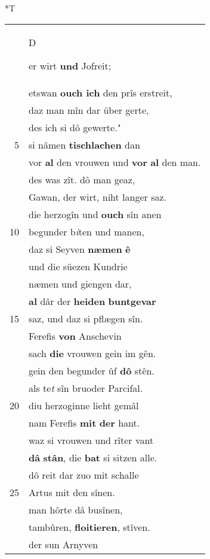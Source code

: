 \documentclass[8pt,a4paper,notitlepage]{article}
\begin{document}
\begin{table}[ht]
\begin{minipage}[t]{0.5\linewidth}
\small
\begin{center}*T
\end{center}
\begin{tabular}{rl}
 & \begin{large}D\end{large}er wirt \textbf{und} Jofreit;\\ 
 & etswan \textbf{ouch ich} den prîs erstreit,\\ 
 & daz man mîn dar über gerte,\\ 
 & des ich si dô gewerte."\\ 
5 & si nâmen \textbf{tischlachen} dan\\ 
 & vor \textbf{al} den vrouwen und \textbf{vor} \textbf{al} den man.\\ 
 & des was zît. dô man geaz,\\ 
 & Gawan, der wirt, niht langer saz.\\ 
 & die herzogîn und \textbf{ouch} sîn anen\\ 
10 & begunder b\textit{i}ten und manen,\\ 
 & daz si Seyven \textbf{næmen} \textbf{ê}\\ 
 & und die süezen Kundrie\\ 
 & næmen und giengen dar,\\ 
 & \textbf{al} dâr der \textbf{heiden} \textbf{buntgevar}\\ 
15 & saz, und daz si pflægen sîn.\\ 
 & Ferefis \textbf{von} Anschevin\\ 
 & sach \textbf{die} vrouwen gein im gên.\\ 
 & gein den begunder ûf \textbf{dô} stên.\\ 
 & als te\textit{t} sîn bruoder Parcifal.\\ 
20 & diu herzoginne lieht gemâl\\ 
 & nam Ferefis \textbf{mit} \textbf{der} hant.\\ 
 & waz si vrouwen und rîter vant\\ 
 & \textbf{dâ} \textbf{stân}, die \textbf{bat} si sitzen alle.\\ 
 & dô reit dar zuo mit schalle\\ 
25 & Artus mit den sînen.\\ 
 & man hôrte dâ busînen,\\ 
 & tambûren, \textbf{floitieren}, stîven.\\ 
 & der sun Arnyven\\ 

\end{tabular}
\end{minipage}
\end{table}
\end{document}
